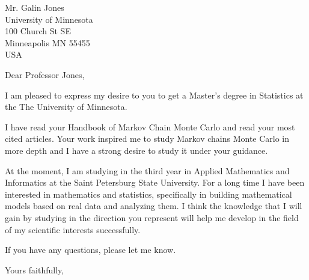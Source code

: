 \documentclass{letter}
\date{\today}
\begin{document}
\begin{letter}{Mr. Galin Jones \\ University of Minnesota \\ 100 Church St SE \\ Minneapolis MN 55455 \\ USA}
\opening{Dear Professor Jones,}
I am pleased to express my desire to you to get a Master's degree in Statistics at the The University of Minnesota.

I have read your Handbook of Markov Chain Monte Carlo and read your most cited articles. Your work inspired me to study Markov chains Monte Carlo in more depth
and I have a strong desire to study it under your guidance.

At the moment, I am studying in the third year in Applied Mathematics and Informatics at the Saint Petersburg State University. For a long time I have been interested in mathematics and statistics, specifically in building mathematical models based on real data and analyzing them. I think the knowledge that I will gain by studying in the direction you represent will help me develop in the field of my scientific interests successfully.

If you have any questions, please let me know.
\closing{Yours faithfully,}
\end{letter}
\end{document}
